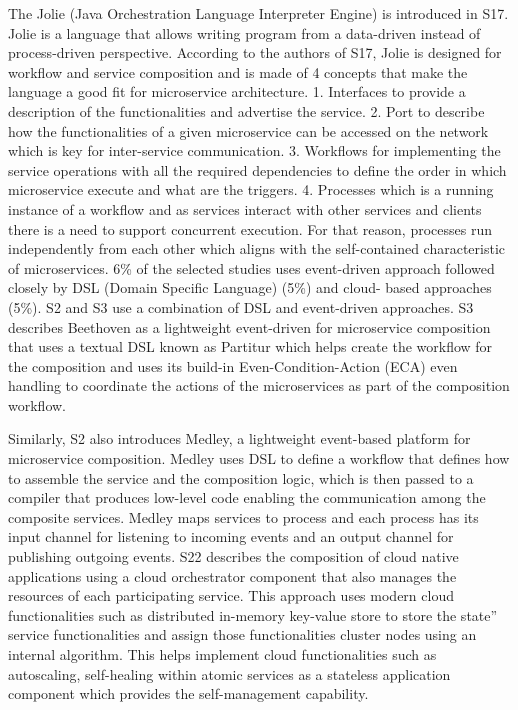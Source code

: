\documentclass{article}
\begin{document}
\begin{multicols}{2}
The Jolie (Java Orchestration Language Interpreter Engine) is introduced in S17. Jolie is a language that allows writing program from a data-driven instead of process-driven perspective. According to the authors of S17, Jolie is designed for workflow and service composition and is made of 4 concepts that make the language a good fit for microservice architecture. 1. Interfaces to provide a description of the functionalities and advertise the service. 2. Port to describe how the functionalities of a given microservice can be accessed on the network which is key for inter-service communication. 3. Workflows for implementing the service operations with all the required dependencies to define the order in which microservice execute and what are the triggers. 4. Processes which is a running instance of a workflow and as services interact with other services and clients there is a need to support concurrent execution. For that reason, processes run independently from each other which aligns with the self-contained characteristic of microservices. 6\% of the selected studies uses event-driven approach followed closely by DSL (Domain Specific Language) (5\%) and cloud- based approaches (5\%). S2 and S3 use a combination of DSL and event-driven approaches. S3 describes Beethoven as a lightweight event-driven for microservice composition that uses a textual DSL known as Partitur which helps create the workflow for the composition and uses its build-in Even-Condition-Action (ECA) even handling to coordinate the actions of the microservices as part of the composition workflow. 

Similarly, S2 also introduces Medley, a lightweight event-based platform for microservice composition. Medley uses DSL to define a workflow that defines how to assemble the service and the composition logic, which is then passed to a compiler that produces low-level code enabling the communication among the composite services. Medley maps services to process and each process has its input channel for listening to incoming events and an output channel for publishing outgoing events. S22 describes the composition of cloud native applications using a cloud orchestrator component that also manages the resources of each participating service. This approach uses modern cloud functionalities such as distributed in-memory key-value store to store the state” service functionalities and assign those functionalities cluster nodes using an internal algorithm. This helps implement cloud functionalities such as autoscaling, self-healing within atomic services as a stateless application component which provides the self-management capability. 


\end{multicols}
\end{document}
